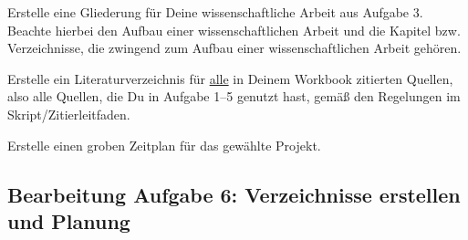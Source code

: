 
\begin{enumerate}[leftmargin=*]
	\itshape{
	\item Erstelle eine Gliederung für Deine wissenschaftliche Arbeit aus Aufgabe 3. Beachte hierbei den Aufbau
	      einer wissenschaftlichen Arbeit und die Kapitel bzw. Verzeichnisse, die zwingend zum Aufbau einer
	      wissenschaftlichen Arbeit gehören.
	\item Erstelle ein Literaturverzeichnis für \uline{alle} in Deinem Workbook zitierten Quellen, also alle Quellen, die Du
	      in Aufgabe 1–5 genutzt hast, gemäß den Regelungen im Skript/Zitierleitfaden.
	\item Erstelle einen groben Zeitplan für das gewählte Projekt.
	      }
\end{enumerate}

\clearpage

\subsection*{Bearbeitung Aufgabe 6: Verzeichnisse erstellen und Planung}

